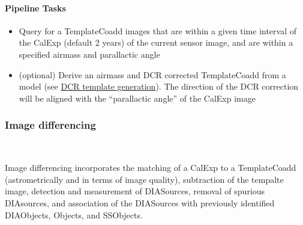\paragraph{Pipeline Tasks}
\begin{itemize}
\item Query for a TemplateCoadd images that are within a given time interval of the CalExp  (default 2 years) of the current sensor image, and are within a specified airmass and parallactic angle
\item (optional) Derive an airmass and DCR corrected TemplateCoadd from a model (see  \hyperref[sec:acDCRTemplates]{ DCR template generation}). The direction of the DCR correction will be aligned with the   ``parallactic angle'' of the CalExp image
\end{itemize}

\subsubsection{Image differencing}~

Image differencing incorporates the matching of a CalExp to a TemplateCoadd (astrometrically and in terms of image quality), subtraction of the tempalte image, detection and measurement of DIASources, removal of spurious DIAsources, and association of the DIASources with previously identified DIAObjects, Objects, and SSObjects. 

